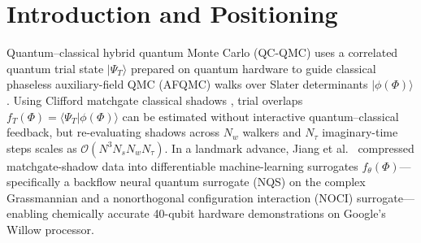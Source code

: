\documentclass[11pt,a4paper]{article}
\theoremstyle{definition}
\newcommand{\Q}{\mathbb{Q}}
\newcommand{\ket}[1]{\lvert #1 \rangle}
\newcommand{\bra}[1]{\langle #1 \rvert}
\newcommand{\braket}[2]{\langle #1 \vert #2 \rangle}
\begin{document}
\begin{abstract}
\[\]
requiring neither measurement of $\bra{\Psi_T} H \ket{\Psi_T}$ nor variationality of the raw mixed energy. Generalizing to degree $d \ge 0$ yields \emph{Surrogate-Anchored Block Hausdorff Certificates} (Theorem~\ref{thm:hausdorff}) for both ground-state upper bounds and oracle-free two-edge visible spectral-gap exclusion using only classical moments $a_k$ and distribution-free Median-of-Means confidence boxes on linear shadow cross-moments $\operatorname{Re}(b_k)$, paired with Prediction-Powered Inference (PPI) walker debiasing (Proposition~\ref{prop:ppi}). All core algebraic, complex-vector projection, variational-boost, and complex spectral-measure conic-dual soundness theorems are formally verified in Lean~4.35.0 (zero \texttt{sorry}, zero custom axioms, zero external dependencies), and all numerical dual certificates on a 4-site Hubbard benchmark are independently verified in exact rational arithmetic ($\Q$) via symmetry-checked pivoted $LDL^\top$ factorization over explicit rational moment enclosures.
\end{abstract}

\section{Introduction and Positioning}

Quantum--classical hybrid quantum Monte Carlo (QC-QMC) \cite{huggins2022unbiasing,zhang2003quantum} uses a correlated quantum trial state $\ket{\Psi_T}$ prepared on quantum hardware to guide classical phaseless auxiliary-field QMC (AFQMC) walks over Slater determinants $\ket{\phi(\Phi)}$. Using Clifford matchgate classical shadows \cite{wan2023matchgate,huang2020predicting}, trial overlaps $f_T(\Phi) = \braket{\Psi_T}{\phi(\Phi)}$ can be estimated without interactive quantum--classical feedback, but re-evaluating shadows across $N_w$ walkers and $N_\tau$ imaginary-time steps scales as $\mathcal{O}(N^3 N_s N_w N_\tau)$. In a landmark advance, Jiang et al.\ \cite{jiang2026machine} compressed matchgate-shadow data into differentiable machine-learning surrogates $f_\theta(\Phi)$---specifically a backflow neural quantum surrogate (NQS) on the complex Grassmannian and a nonorthogonal configuration interaction (NOCI) surrogate---enabling chemically accurate 40-qubit hardware demonstrations on Google's Willow processor.
\end{document}
